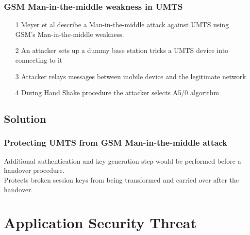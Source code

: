 \documentclass{beamer}
\begin{document}
\begin{frame}
	\frametitle{GSM Man-in-the-middle weakness in UMTS}
	\begin{itemize}
	\item[1]Meyer et al describe a Man-in-the-middle attack against UMTS using GSM's Man-in-the-middle weakness.
	\item[2]An attacker sets up a dummy base station tricks a UMTS device into connecting to it
	\item[3]Attacker relays messages between mobile device and the legitimate network
	\item[4]During Hand Shake procedure the attacker selects A5/0 algorithm
	\end{itemize}
	
	
\end{frame}
\subsection{Solution}
\begin{frame}


\frametitle{Protecting UMTS from GSM Man-in-the-middle attack}
 Additional authentication and key generation step would be performed before a handover procedure.\\
 Protects broken session keys from being transformed and carried over after the handover.
\end{frame}
\section{Application Security Threat}

\end{document}
